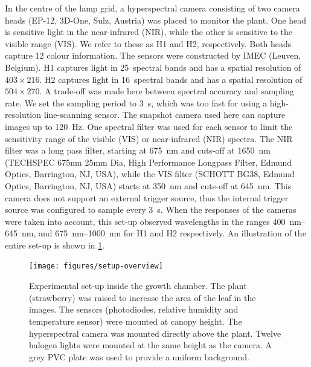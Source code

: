 \documentclass[10pt,authoryear,a4paper]{elsarticle}
\begin{document}
        In the centre of the lamp grid, a hyperspectral camera consisting of two camera heads (EP-12, {3D-One}, Sulz, Austria) was placed to monitor the plant. One head is sensitive light in the near-infrared (NIR), while the other is sensitive to the visible range (VIS). We refer to these as H1 and H2, respectively. Both heads capture \SI{12}{\bit} colour information. The sensors were constructed by IMEC (Leuven, Belgium).
        H1 captures light in 25~spectral bands and has a spatial resolution of $403 \times 216$. H2 captures light in 16~spectral bands and has a spatial resolution of $504 \times 270$. A trade-off was made here between spectral accuracy and sampling rate. We set the sampling period to \SI{3}{\second}, which was too fast for using a high-resolution line-scanning sensor. The snapshot camera used here can capture images up to \SI{120}{\hertz}. 
        One spectral filter was used for each sensor to limit the sensitivity range of the visible (VIS) or near-infrared (NIR) spectra. The NIR filter was a long pass filter, starting at \SI{675}{\nano\metre} and cuts-off at \SI{1650}{\nano\metre} (TECHSPEC 675nm 25mm Dia, High Performance Longpass Filter, Edmund Optics, Barrington, NJ, USA), while the VIS filter (SCHOTT BG38, Edmund Optics, Barrington, NJ, USA) starts at \SI{350}{\nano\metre} and cuts-off at \SI{645}{\nano\metre}. This camera does not support an external trigger source, thus the internal trigger source was configured to sample every \SI{3}{\second}. When the responses of the cameras were taken into account, this set-up observed wavelengths in the ranges \SIrange{400}{645}{\nano\metre}, and \SIrange{675}{1000}{\nano\metre} for H1 and H2 respectively. %
        An illustration of the entire set-up is shown in \cref{setup-overview}.
        
        \begin{figure}[thb]
            \centering
            \texttt{[image: figures/setup-overview]}
            \caption{Experimental set-up inside the growth chamber. The plant (strawberry) was raised to increase the area of the leaf in the images. The sensors (photodiodes, relative humidity and temperature sensor) were mounted at canopy height. The hyperspectral camera was mounted directly above the plant. Twelve halogen lights were mounted at the same height as the camera. A grey PVC plate was used to provide a uniform background.}
            \label{setup-overview}
        \end{figure}
        
\end{document}

